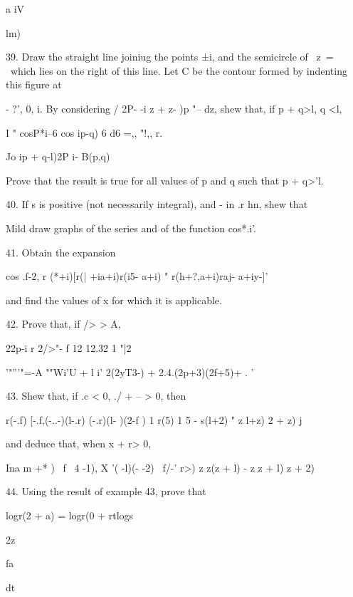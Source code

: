 a iV

lm)\

%
%

39. Draw the straight line joiniug the points ±i, and the semicircle
of \ z\ = \ which lies on the right of this line. Let C be the contour
formed by indenting this figure at

- ?', 0, i. By considering / 2P- -i z + z- )p "-- dz, shew that, if p
+ q>l, q <l,

I " cosP*i--6 cos ip-q) 6 d6 =,, "!,, r.

Jo ip + q-l)2P i- B(p,q)

Prove that the result is true for all values of p and q such that p +
q>'l.


40. If s is positive (not necessarily integral), and - in .r hn, shew
that

Mild draw graphs of the series and of the function cos*.i'.

41. Obtain the expansion

cos .f-2, r (*+i)[r(| +ia+i)r(i5- a+i) " r(h+?,a+i)raj- a+iy-]'

and find the values of x for which it is applicable. 

42. Prove that, if /> > A,

22p-i r 2/>"- f 12 12.32 1 "|2

'"'''"=-A ""Wi'U + l i' 2(2yT3-) + 2.4.(2p+3)(2f+5)+ . '


43. Shew that, if .c < 0, ./ + -- > 0, then

r(-.f) [-.f,(-..-)(l-.r) (-.r)(l- )(2-f ) 1 r(5) 1 5 - s(l+2) " z
l+z) 2 + z) j

and deduce that, when x + r> 0,

  Ina m +* ) \ f \ 4   -1), X '( -l)(- -2) \ f/-' r>) z z(z +
l) - z z + l) z + 2)

44. Using the result of example 43, prove that

logr(2 + a) = logr(0 + rtlogs

2z

fa

dt


